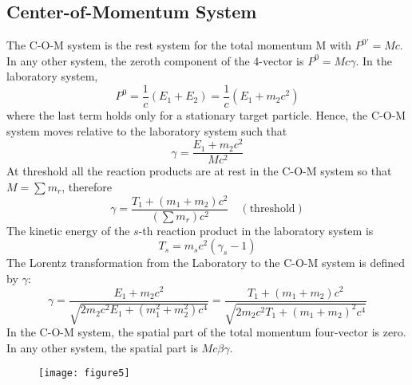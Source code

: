 \documentclass{article}
\begin{document}
    \subsection*{Center-of-Momentum System}
    The C-O-M system is the rest system for the total momentum M with $P^{0'} = Mc$. In any other system, the zeroth component of the 4-vector is $P^0 = M c \gamma$.
    In the laboratory system,
    $$ P^0 = \frac{1}{c}(E_1+E_2) = \frac{1}{c}(E_1+m_2c^2) $$
    where the last term holds only for a stationary target particle. Hence, the C-O-M system moves relative to the laboratory system such that
    $$ \gamma = \frac{E_1+m_2c^2}{Mc^2} $$
    At threshold all the reaction products are at rest in the C-O-M system so that $M = \sum m_r$, therefore
    $$ \gamma = \frac{T_1 + (m_1+m_2)c^2}{(\sum m_r) c^2} \quad (\text{threshold}) $$
    The kinetic energy of the $s$-th reaction product in the laboratory system is
    $$ T_s = m_s c^2 (\gamma_s - 1) $$
    The Lorentz transformation from the Laboratory to the C-O-M system is defined by $\gamma$:
    $$ \gamma = \frac{E_1+m_2 c^2}{\sqrt{2m_2 c^2 E_1 + (m_1^2+m_2^2)c^4}} = \frac{T_1+(m_1+m_2)c^2}{\sqrt{2m_2c^2 T_1 + (m_1+m_2)^2 c^4}} $$
    In the C-O-M system, the spatial part of the total momentum four-vector is zero. In any other system, the spatial part is $M c \beta \gamma$.
    
    \begin{figure}[h]
    	\centering
    	\texttt{[image: figure5]}
    	\caption{}
    	\label{fig:figure5}
    \end{figure}
    
\end{document}
